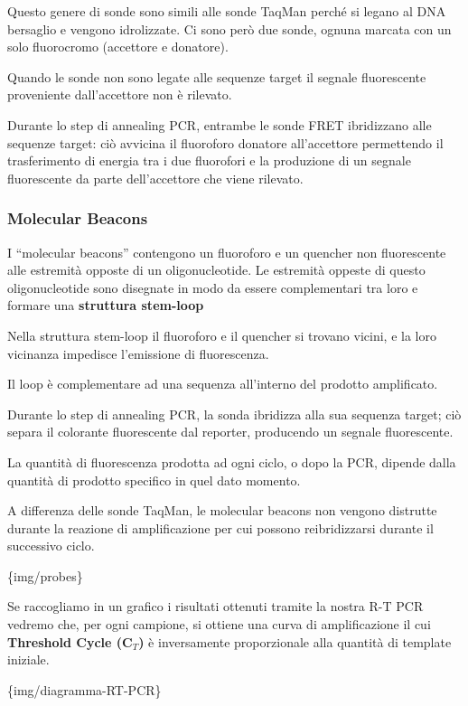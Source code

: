 \documentclass[11pt]{book}
\begin{document}
Questo genere di sonde sono simili alle sonde TaqMan perché si legano al
DNA bersaglio e vengono idrolizzate. Ci sono però due sonde, ognuna
marcata con un solo fluorocromo (accettore e donatore).

Quando le sonde non sono legate alle sequenze target il segnale
fluorescente proveniente dall'accettore non è rilevato.

Durante lo step di annealing PCR, entrambe le sonde FRET ibridizzano
alle sequenze target: ciò avvicina il fluoroforo donatore all'accettore
permettendo il trasferimento di energia tra i due fluorofori e la
produzione di un segnale fluorescente da parte dell'accettore che viene
rilevato.

\subsubsection{Molecular Beacons}\label{molecular-beacons}

I ``molecular beacons'' contengono un fluoroforo e un quencher non
fluorescente alle estremità opposte di un oligonucleotide. Le estremità
oppeste di questo oligonucleotide sono disegnate in modo da essere
complementari tra loro e formare una \textbf{struttura stem-loop}

Nella struttura stem-loop il fluoroforo e il quencher si trovano vicini,
e la loro vicinanza impedisce l'emissione di fluorescenza.

Il loop è complementare ad una sequenza all'interno del prodotto
amplificato.

Durante lo step di annealing PCR, la sonda ibridizza alla sua sequenza
target; ciò separa il colorante fluorescente dal reporter, producendo un
segnale fluorescente.

La quantità di fluorescenza prodotta ad ogni ciclo, o dopo la PCR,
dipende dalla quantità di prodotto specifico in quel dato momento.

A differenza delle sonde TaqMan, le molecular beacons non vengono
distrutte durante la reazione di amplificazione per cui possono
reibridizzarsi durante il successivo ciclo.

\{img/probes\}

Se raccogliamo in un grafico i risultati ottenuti tramite la nostra R-T
PCR vedremo che, per ogni campione, si ottiene una curva di
amplificazione il cui \textbf{Threshold Cycle (C\(_T\))} è inversamente
proporzionale alla quantità di template iniziale.

\{img/diagramma-RT-PCR\}
\end{document}
